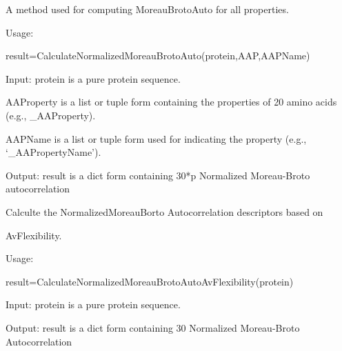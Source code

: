 \documentclass[letterpaper,10pt,english]{sphinxmanual}
\begin{document}

\begin{fulllineitems}
\label{reference/Autocorrelation:Autocorrelation.CalculateNormalizedMoreauBrotoAuto}
A method used for computing MoreauBrotoAuto for all properties.

Usage:

result=CalculateNormalizedMoreauBrotoAuto(protein,AAP,AAPName)

Input: protein is a pure protein sequence.

AAProperty is a list or tuple form containing the properties of 20 amino acids (e.g., \_AAProperty).

AAPName is a list or tuple form used for indicating the property (e.g., `\_AAPropertyName').

Output: result is a dict form containing 30*p Normalized Moreau-Broto autocorrelation

\end{fulllineitems}


\begin{fulllineitems}
\label{reference/Autocorrelation:Autocorrelation.CalculateNormalizedMoreauBrotoAutoAvFlexibility}
Calculte the NormalizedMoreauBorto Autocorrelation descriptors based on

AvFlexibility.

Usage:

result=CalculateNormalizedMoreauBrotoAutoAvFlexibility(protein)

Input: protein is a pure protein sequence.

Output: result is a dict form containing 30 Normalized Moreau-Broto Autocorrelation

\end{fulllineitems}

\end{document}
